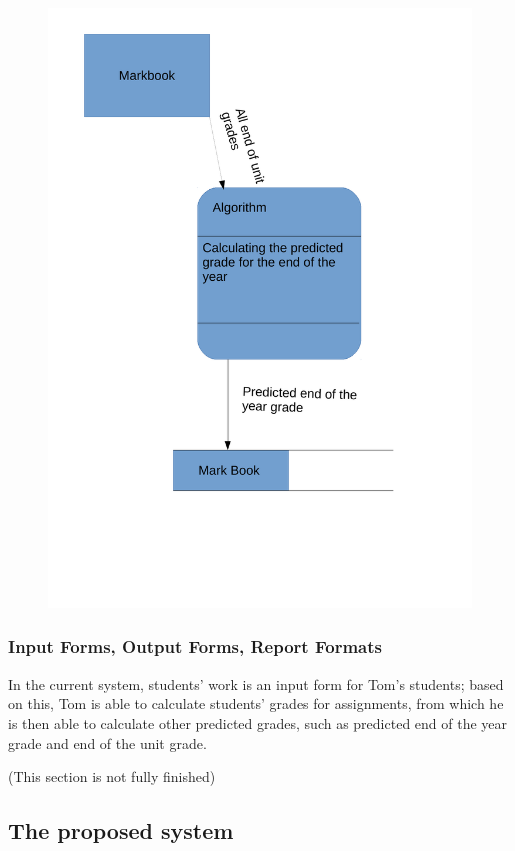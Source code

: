 \begin{algorithm}[H]
\begin{figure}[H]
    \includegraphics[width=\textwidth]{./Analysis/images/DataFlowDiagrams2.pdf}
\end{figure}

\subsubsection{Input Forms, Output Forms, Report Formats}

In the current system, students' work is an input form for Tom's students; based on this, Tom is able to calculate students' grades for assignments, from which he is then able to calculate other predicted grades, such as predicted end of the year grade and end of the unit grade.

(This section is not fully finished)

\subsection{The proposed system}


\end{algorithm}
